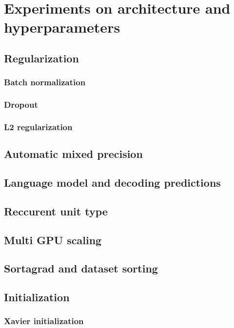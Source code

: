 \documentclass[licencjacka,en]{pracamgr}
\begin{document}
\chapter{Experiments on architecture and hyperparameters}\label{r:hypers}

\section{Regularization}
\subsection{Batch normalization}
\subsection{Dropout}
\subsection{L2 regularization}

\section{Automatic mixed precision}

\section{Language model and decoding predictions}

\section{Reccurent unit type}

\section{Multi GPU scaling}

\section{Sortagrad and dataset sorting}

\section{Initialization}
\subsection{Xavier initialization}
\end{document}
